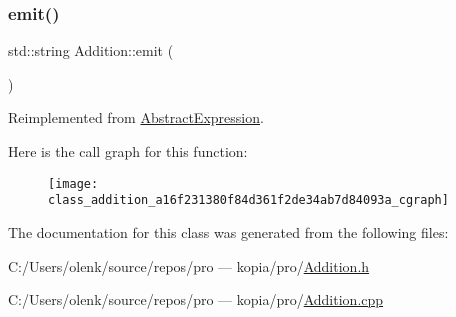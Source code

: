 \subsubsection{\texorpdfstring{emit()}{emit()}}
{\footnotesize\ttfamily std\+::string Addition\+::emit (\begin{DoxyParamCaption}{ }\end{DoxyParamCaption})\hspace{0.3cm}{\ttfamily [virtual]}}



Reimplemented from \mbox{\hyperlink{class_abstract_expression_a9f19c05e663491688cdf4423e002a391}{Abstract\+Expression}}.

Here is the call graph for this function\+:
\nopagebreak
\begin{figure}[H]
\begin{center}
\leavevmode
\texttt{[image: class\_addition\_a16f231380f84d361f2de34ab7d84093a\_cgraph]}
\end{center}
\end{figure}


The documentation for this class was generated from the following files\+:\begin{DoxyCompactItemize}
\item 
C\+:/\+Users/olenk/source/repos/pro — kopia/pro/\mbox{\hyperlink{_addition_8h}{Addition.\+h}}\item 
C\+:/\+Users/olenk/source/repos/pro — kopia/pro/\mbox{\hyperlink{_addition_8cpp}{Addition.\+cpp}}\end{DoxyCompactItemize}

